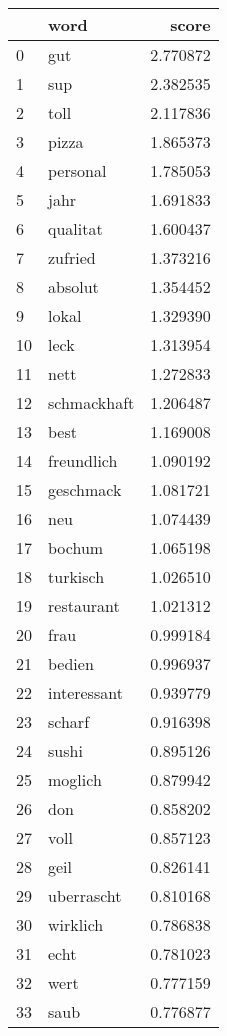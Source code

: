 \begin{tabular}{llr}
\toprule
{} &          word &     score \\
\midrule
0  &           gut &  2.770872 \\
1  &           sup &  2.382535 \\
2  &          toll &  2.117836 \\
3  &         pizza &  1.865373 \\
4  &      personal &  1.785053 \\
5  &          jahr &  1.691833 \\
6  &      qualitat &  1.600437 \\
7  &       zufried &  1.373216 \\
8  &       absolut &  1.354452 \\
9  &         lokal &  1.329390 \\
10 &          leck &  1.313954 \\
11 &          nett &  1.272833 \\
12 &   schmackhaft &  1.206487 \\
13 &          best &  1.169008 \\
14 &    freundlich &  1.090192 \\
15 &     geschmack &  1.081721 \\
16 &           neu &  1.074439 \\
17 &        bochum &  1.065198 \\
18 &      turkisch &  1.026510 \\
19 &    restaurant &  1.021312 \\
20 &          frau &  0.999184 \\
21 &        bedien &  0.996937 \\
22 &   interessant &  0.939779 \\
23 &        scharf &  0.916398 \\
24 &         sushi &  0.895126 \\
25 &       moglich &  0.879942 \\
26 &           don &  0.858202 \\
27 &          voll &  0.857123 \\
28 &          geil &  0.826141 \\
29 &    uberrascht &  0.810168 \\
30 &      wirklich &  0.786838 \\
31 &          echt &  0.781023 \\
32 &          wert &  0.777159 \\
33 &          saub &  0.776877 \\

\end{tabular}
